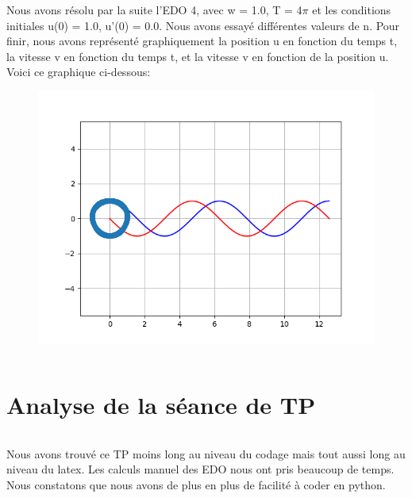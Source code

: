 \documentclass{article}
\begin{document}
Nous avons résolu par la suite l'EDO 4, avec w = 1.0, T = 4$\pi$ et les conditions initiales u(0) = 1.0, u'(0) = 0.0. Nous avons essayé différentes valeurs de n.
\newline
\newline
Pour finir, nous avons représenté graphiquement la position u en fonction du temps t, la vitesse v en fonction du temps t, et la vitesse v en fonction de la position u.
\newline
Voici ce graphique ci-dessous:
\newline
\begin{figure}
        \centering
        \includegraphics[width=1\textwidth]{graphf5.png}
\end{figure}

$$ $$
$$ $$
$$ $$
$$ $$
$$ $$
$$ $$
$$ $$
$$ $$
$$ $$
$$ $$
$$ $$
$$ $$
$$ $$
$$ $$
$$ $$

\section{Analyse de la séance de TP}
$$ $$

Nous avons trouvé ce TP moins long au niveau du codage mais tout aussi long au niveau du latex. Les calculs manuel des EDO nous ont pris beaucoup de temps. Nous constatons que nous avons de plus en plus de facilité à coder en python.
\end{document}
